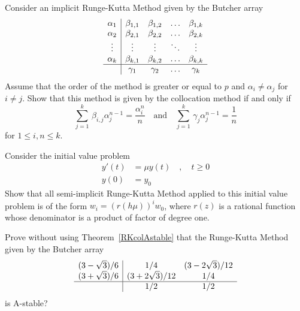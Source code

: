 \begin{question}
Consider an implicit Runge-Kutta Method given by the Butcher array
\[
\begin{array}{c|cccc}
\alpha_1 & \beta_{1,1} & \beta_{1,2} & \ldots & \beta_{1,k} \\
\alpha_2 & \beta_{2,1} & \beta_{2,2} & \ldots & \beta_{2,k} \\
 \vdots & \vdots & \vdots & \ddots & \vdots \\
\alpha_k & \beta_{k,1} & \beta_{k,2} & \ldots & \beta_{k,k} \\
\hline
& \gamma_1 & \gamma_2 & \ldots & \gamma_k \\
\end{array}
\]
Assume that the order of the method is greater or equal to $p$ and
$\alpha_i \not= \alpha_j$ for $i\neq j$.  Show that this method is
given by the collocation method if and only if
\begin{equation}\label{GradQ7}
\sum_{j=1}^k \, \beta_{i,j} \alpha_j^{n-1} = \frac{\alpha_i^n}{n}
\quad \text{and} \quad
\sum_{j=1}^k \, \gamma_j \alpha_j^{n-1} = \frac{1}{n}
\end{equation}
for $1 \leq i,n \leq k$.
\label{initQ10}
\end{question}

\begin{question}
Consider the initial value problem
\begin{align*}
y'(t) &= \mu y(t) \quad , \quad  t \geq 0 \\
y(0) &= y_0
\end{align*}
Show that all semi-implicit Runge-Kutta Method applied to this initial
value problem is of the form $w_i = (r(h\mu))^iw_0$, where $r(z)$
is a rational function whose denominator is a product of factor of
degree one.
\label{initQ11}
\end{question}

\begin{question}
Prove without using Theorem~\ref{RKcolAstable} that the Runge-Kutta
Method given by the Butcher array 
\[
\begin{array}{c|cc}
(3-\sqrt{3})/6 & 1/4 & (3-2\sqrt{3})/12 \\
(3+\sqrt{3})/6 & (3+2\sqrt{3})/12 & 1/4 \\
\hline
 & 1/2 & 1/2
\end{array}
\]
is A-stable?
\label{initQ12}
\end{question}

